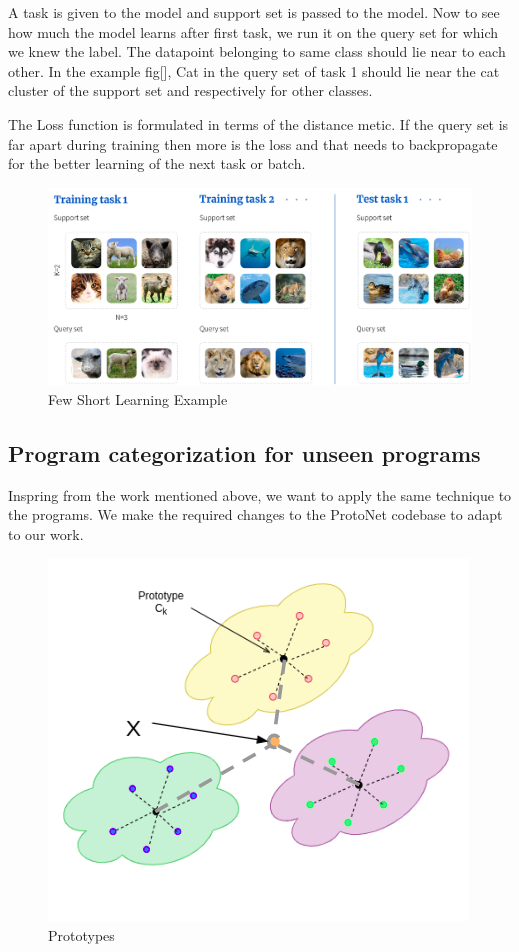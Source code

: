     A task is given to the model and support set is passed to the model. Now to see how much the model learns after first task, we run it on the query set for which we knew the label. The datapoint belonging to same class should lie near to each other. In the example fig[], Cat in the query set of task 1 should lie near the cat cluster of the support set and respectively for other classes.
	
	The Loss function is formulated in terms of the distance metic. If the query set is far apart during training then more is the loss and that needs to backpropagate for the better learning of the next task or batch.

\begin{figure}[t]
    \centering
    \includegraphics[scale=0.4]{figures/chapter-2/unsupervised_few_short.png}
    \caption{Few Short Learning Example}
     \label{fig:unsupervised-fewShort}
\end{figure}

\subsection{Program categorization for unseen programs}
Inspring from the work mentioned above, we want to apply the same technique to the programs. We make the required changes to the ProtoNet codebase to adapt to our work. 

\begin{figure}[t]
    \centering
    \includegraphics[scale=0.5]{figures/chapter-2/prototypes.png}
    \caption{Prototypes}
     \label{fig:unsupervised-prototypes}
\end{figure}

